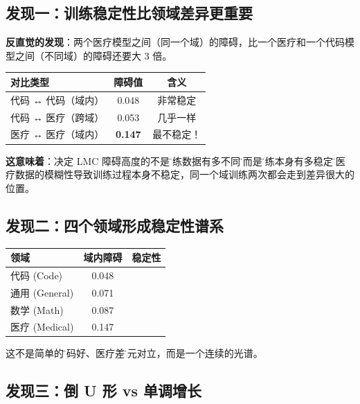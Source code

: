 \documentclass[12pt,a4paper]{article}
\begin{document}
\subsection{发现一：训练稳定性比领域差异更重要}

\begin{keybox}
\textbf{反直觉的发现}：两个医疗模型之间（同一个域）的障碍，比一个医疗和一个代码模型之间（不同域）的障碍还要大 3 倍。

\begin{center}
\begin{tabular}{@{}lcc@{}}
\toprule
\textbf{对比类型} & \textbf{障碍值} & \textbf{含义} \\
\midrule
代码 ↔ 代码（域内） & 0.048 & 非常稳定 \\
代码 ↔ 医疗（跨域） & 0.053 & 几乎一样 \\
医疗 ↔ 医疗（域内） & \textbf{0.147} & 最不稳定！\\
\bottomrule
\end{tabular}
\end{center}

\textbf{这意味着}：决定 LMC 障碍高度的不是\"训练数据有多不同\"，而是\"训练本身有多稳定\"。医疗数据的模糊性导致训练过程本身不稳定，同一个域训练两次都会走到差异很大的位置。
\end{keybox}

\subsection{发现二：四个领域形成稳定性谱系}

\begin{center}
\begin{tabular}{@{}lcc@{}}
\toprule
\textbf{领域} & \textbf{域内障碍} & \textbf{稳定性} \\
\midrule
代码 (Code) & 0.048 & \color{generalgreen}{最稳定 ★★★★}\\
通用 (General) & 0.071 & \color{generalgreen}{稳定 ★★★}\\
数学 (Math) & 0.087 & \color{mathorange}{中等 ★★}\\
医疗 (Medical) & 0.147 & \color{medred}{不稳定 ★}\\
\bottomrule
\end{tabular}
\end{center}

这不是简单的\"代码好、医疗差\"二元对立，而是一个连续的光谱。

\subsection{发现三：倒 U 形 vs 单调增长}
\end{document}
